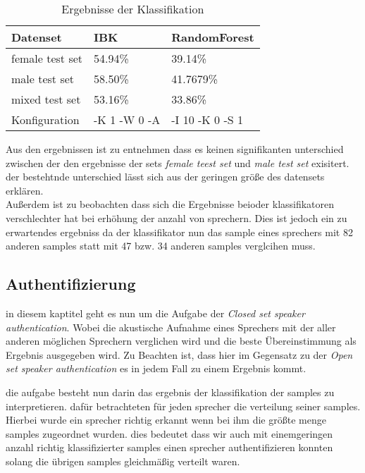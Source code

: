 \begin{table}[h]
	\centering
    \begin{tabular}{ | l | l | l |}
    \hline
    Datenset 		& IBK & RandomForest  \\ \hline 
    female test set & 54.94\%  & 39.14\% \\ \hline
    male test set 	& 58.50\%  & 41.7679\% \\ \hline
    mixed test set 	& 53.16\%  & 33.86\% \\ \hline
    Konfiguration	& -K 1 -W 0 -A & -I 10 -K 0 -S 1 \\ \hline
    \end{tabular}
    \caption{Ergebnisse der Klassifikation}
   \label{table:resultsClassifiers}
\end{table}

Aus den ergebnissen ist zu entnehmen dass es keinen signifikanten unterschied zwischen der den ergebnisse der sets \textit{female teest set} und \textit{male test set} exisitert. der bestehtnde unterschied lässt sich aus der geringen größe des datensets erklären.\\


Außerdem ist zu beobachten dass sich die Ergebnisse beioder klassifikatoren verschlechter hat bei erhöhung der anzahl von sprechern.
Dies ist jedoch ein zu erwartendes ergebniss da der klassifikator nun das sample eines sprechers mit 82 anderen samples statt mit 47 bzw. 34 anderen samples verglcihen muss.\\





\subsection{Authentifizierung}
\label{auth}

in diesem kaptitel geht es nun um die Aufgabe der \textit{Closed set speaker authentication}. Wobei die akustische Aufnahme eines Sprechers mit der aller anderen möglichen Sprechern verglichen wird und die beste Übereinstimmung als Ergebnis ausgegeben wird.\cite{beigi}
Zu Beachten ist, dass hier im Gegensatz zu der \textit{Open set speaker authentication} es in jedem Fall zu einem Ergebnis kommt.

die aufgabe besteht nun darin das ergebnis der klassifikation der samples zu interpretieren. 
dafür betrachteten für jeden sprecher die verteilung seiner samples.
Hierbei wurde ein sprecher richtig erkannt wenn bei ihm die größte menge samples zugeordnet wurden.
dies bedeutet dass wir auch mit einemgeringen anzahl richtig klassifizierter samples einen sprecher authentifizieren konnten solang die übrigen samples gleichmäßig verteilt waren. 

